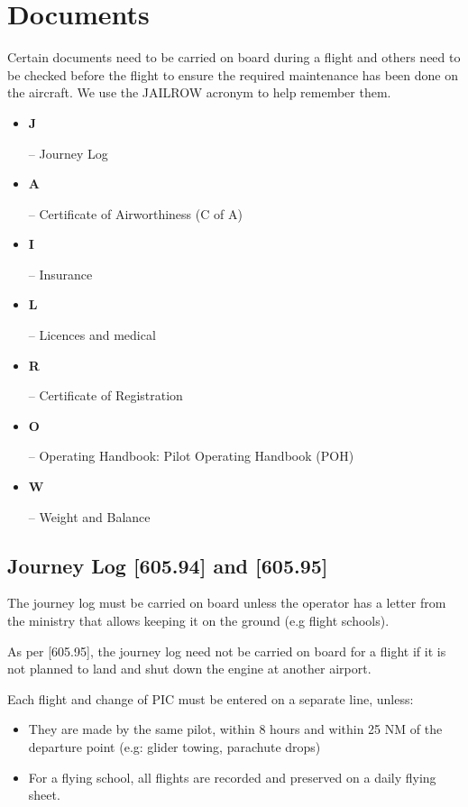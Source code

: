 \documentclass[12pt,letterpaper]{article}
\begin{document}
 \section{Documents}
    \begin{samepage}
    
    Certain documents need to be carried on board during a flight and others need to be checked before the flight to ensure the required maintenance has been done on the aircraft. We use the JAILROW acronym to help remember them.
    
    \begin{itemize}
        \item \parbox[t]{0.4cm}{\textbf{J}} -- Journey Log
        \item \parbox[t]{0.4cm}{\textbf{A}} -- Certificate of Airworthiness (C of A)
        \item \parbox[t]{0.4cm}{\textbf{I}} -- Insurance
        \item \parbox[t]{0.4cm}{\textbf{L}} -- Licences and medical
        \item \parbox[t]{0.4cm}{\textbf{R}} -- Certificate of Registration 
        \item \parbox[t]{0.4cm}{\textbf{O}} -- Operating Handbook:  Pilot Operating Handbook (POH)
        \item \parbox[t]{0.4cm}{\textbf{W}} -- Weight and Balance
    \end{itemize}
    \end{samepage}

    \subsection{Journey Log [605.94] and [605.95]}
    
    The journey log must be carried on board unless the operator has a letter from the ministry that allows keeping it on the ground (e.g flight schools).
    
    As per [605.95], the journey log need not be carried on board for a flight if it is not planned to land and shut down the engine at another airport.
    
    Each flight and change of PIC must be entered on a separate line, unless:
    \begin{itemize}
        \item They are made by the same pilot, within 8 hours and within 25 NM of the departure point (e.g: glider towing, parachute drops)
        \item For a flying school, all flights are recorded and preserved on a daily flying sheet.
    \end{itemize}
    
\end{document}
